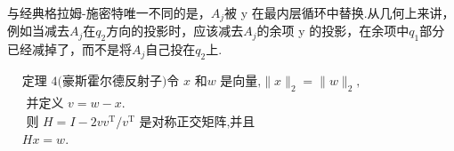 \documentclass[UTF8,5pt,a4paper]{ctexart} %
\begin{document}
\begin{multicols}{4}
与经典格拉姆-施密特唯一不同的是，$A_j$被 y 在最内层循环中替换.从几何上来讲， 例如当减去$A_j$在$q_2$方向的投影时，应该减去$A_j$的余项 y 的投影，在余项中$q_{1}$部分已经减掉了，而不是将$A_j$自己投在$q_2$上. 

$\begin{aligned}&\text{定理 }4(\text{豪斯霍尔德反射子)令 }x\text{ 和}w\text{ 是向量,}\parallel x\parallel_2=\parallel w\parallel_2,\\
    &\text{ 并定义 }v=w-x.\\
    &\text{ 则 }H=I-2vv^{\mathrm{T}}/v^{\mathrm{T}}\text{ 是对称正交矩阵,并且 }\\
    &Hx=w.\end{aligned}$





























































\end{multicols}
\end{document}
